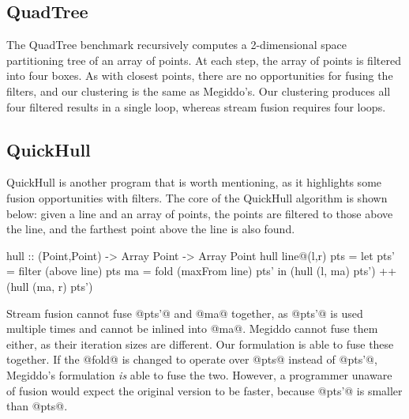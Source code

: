 \subsection{QuadTree}
The QuadTree benchmark recursively computes a 2-dimensional space partitioning tree of an array of points.
At each step, the array of points is filtered into four boxes.
As with closest points, there are no opportunities for fusing the filters, and our clustering is the same as Megiddo's.
Our clustering produces all four filtered results in a single loop, whereas stream fusion requires four loops.


\subsection{QuickHull}
QuickHull is another program that is worth mentioning, as it highlights some fusion opportunities with filters.
The core of the QuickHull algorithm is shown below: given a line and an array of points, the points are filtered to those above the line, and the farthest point above the line is also found.

\begin{code}
hull :: (Point,Point) -> Array Point -> Array Point
hull line@(l,r) pts
 = let pts' = filter (above   line) pts
       ma   = fold   (maxFrom line) pts'
   in (hull (l, ma) pts') ++ (hull (ma, r) pts')
\end{code}

Stream fusion cannot fuse @pts'@ and @ma@ together, as @pts'@ is used multiple times and cannot be inlined into @ma@.
Megiddo cannot fuse them either, as their iteration sizes are different.
Our formulation is able to fuse these together.
If the @fold@ is changed to operate over @pts@ instead of @pts'@, Megiddo's formulation \emph{is} able to fuse the two.
However, a programmer unaware of fusion would expect the original version to be faster, because @pts'@ is smaller than @pts@.

